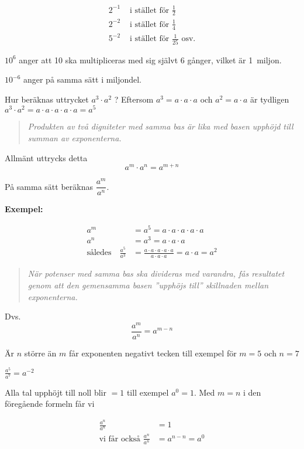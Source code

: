 \begin{align*}
2^{-1} & \text{ i stället för } \frac{1}{2} \\
2^{-2} & \text{ i stället för } \frac{1}{4} \\
5^{-2} & \text{ i stället för } \frac{1}{25} \text{ osv.}
\end{align*}

\(10^6\) anger att 10 ska multipliceras med sig självt 6 gånger, vilket är
1~miljon.

\(10^{-6}\) anger på samma sätt i miljondel.

Hur beräknas uttrycket \(a^3 \cdot a^2\) ?
Eftersom \(a^3 = a \cdot a \cdot a\) och \(a^2 = a \cdot a\) är tydligen
\(a^3 \cdot a^2 = a \cdot a \cdot a \cdot a \cdot a = a^5\)

\begin{quote}\emph{Produkten av två digniteter med samma bas är lika med basen
    upphöjd till summan av exponenterna.}\end{quote}

Allmänt uttrycks detta \[a^m \cdot a^n = a^{m+n}\]

På samma sätt beräknas \(\dfrac{a^m}{a^n}\).

\textbf{Exempel:}

\begin{align*}
a^m &= a^5 = a \cdot a \cdot a \cdot a \cdot a \\
a^n &= a^3 = a \cdot a \cdot a \\
\text{således} \quad
\frac{a^5}{a^3}&=\frac{a \cdot a \cdot a \cdot a \cdot a}{a \cdot a \cdot a} =
a \cdot a = a^2
\end{align*}

\begin{quote}\emph{När potenser med samma bas ska divideras med varandra, fås
resultatet genom att den gemensamma basen ''upphöjs till'' skillnaden mellan
exponenterna.}\end{quote}

Dvs. \[\frac{a^m}{a^n} = a^{m-n}\]

Är \(n\) större än \(m\) får exponenten negativt tecken till exempel för \(m = 5\) och
\(n = 7\)

\(\frac{a^5}{a^7} = a^{-2}\)

Alla tal upphöjt till noll blir \(= 1\) till exempel \(a^0 = 1\).
Med \(m = n\) i den föregående formeln får vi

\begin{align*}
  \frac{a^n}{a^n} &= 1 \\
  \text{vi får också }\frac{a^n}{a^n} &= a^{n-n} =a^0
\end{align*}

